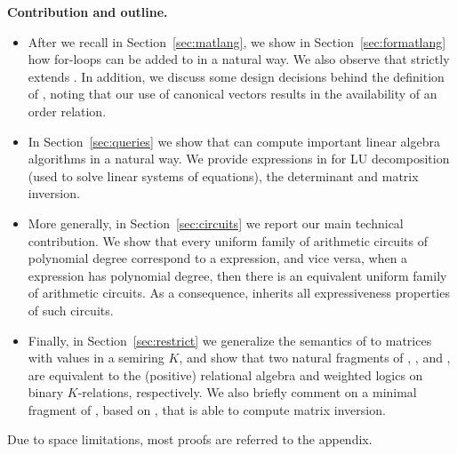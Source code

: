 \smallskip
\noindent
\textbf{Contribution and outline.} 
\begin{itemize}[leftmargin=0.5cm]
	\item After we recall \lang in Section~\ref{sec:matlang}, we show in Section~\ref{sec:formatlang}
	how for-loops can be added to \lang in a natural way. We also observe that
	\langfor strictly extends \lang. In addition, we discuss some design decisions behind the definition of \langfor, noting that our use of canonical vectors results in the availability of an order relation.
	
	\item In Section~\ref{sec:queries} we show that \langfor can compute important linear algebra algorithms in a natural way. We provide expressions in \langfor for LU decomposition (used to solve linear systems of equations), the determinant and matrix inversion.
	\item More generally, in Section~\ref{sec:circuits} we report our main technical contribution.
	 We show that every uniform family of arithmetic circuits of polynomial degree correspond to a \langfor expression, and vice versa, when a \langfor expression has polynomial degree, then there is an equivalent uniform family of arithmetic circuits. As a consequence, \langfor inherits all expressiveness properties of such circuits.
	\item  Finally, in Section~\ref{sec:restrict} we generalize the semantics of \langfor to matrices with values in a semiring $K$, and show that two natural fragments of \langfor, \langsum, and \langprod, are equivalent to the (positive) relational algebra and weighted logics on binary $K$-relations, respectively. We also briefly comment on a minimal fragment of \langfor, based on \langmprod, that is able to compute matrix inversion.
\end{itemize}
Due to space limitations, most proofs are referred to the appendix.
%
